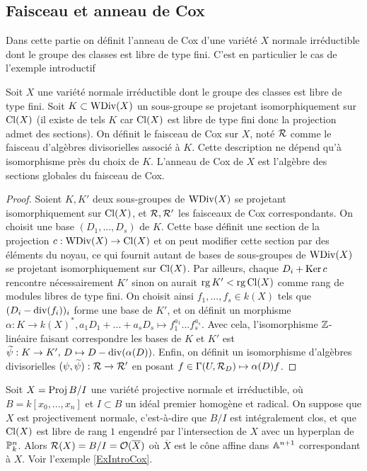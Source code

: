\subsection{Faisceau et anneau de Cox}

Dans cette partie on définit l'anneau de Cox d'une variété $X$ normale irréductible dont le groupe des classes est libre de type fini. C'est en particulier le cas de l'exemple introductif

\begin{cons}\label{consFreeCoxRing}
Soit $X$ une variété normale irréductible dont le groupe des classes est libre de type fini. Soit $K\subset \operatorname{WDiv}(X)$ un sous-groupe se projetant isomorphiquement sur $\operatorname{Cl}(X)$ (il existe de tels $K$ car $\operatorname{Cl}(X)$ est libre de type fini donc la projection admet des sections). On définit le faisceau de Cox sur $X$, noté $\mathcal{R}$ comme le faisceau d'algèbres divisorielles associé à $K$. Cette description ne dépend qu'à isomorphisme près du choix de $K$. L'anneau de Cox de $X$ est l'algèbre des sections globales du faisceau de Cox. 
\end{cons}
\begin{proof}
Soient $K,K'$ deux sous-groupes de $\operatorname{WDiv}(X)$ se projetant isomorphiquement sur $\operatorname{Cl}(X)$, et $\mathcal{R},\mathcal{R}'$ les faisceaux de Cox correspondants. On choisit une base $(D_1,...,D_s)$ de $K$. Cette base définit une section de la projection $c:\operatorname{WDiv}(X)\rightarrow \operatorname{Cl}(X)$ et on peut modifier cette section par des éléments du noyau, ce qui fournit autant de bases de sous-groupes de $\operatorname{WDiv}(X)$ se projetant isomorphiquement sur $\operatorname{Cl}(X)$. Par ailleurs, chaque $D_i+\operatorname{Ker} c$ rencontre nécessairement $K'$ sinon on aurait $\operatorname{rg} K' < \operatorname{rg} \operatorname{Cl}(X)$ comme rang de modules libres de type fini. On choisit ainsi $f_1,...,f_s\in k(X)$ tels que $(D_i-\operatorname{div}(f_i))_i$ forme une base de $K'$, et on définit un morphisme $\alpha:K\rightarrow k(X)^*, a_1D_1+...+a_sD_s\mapsto f_1^{a_1}...f_s^{a_s}$. Avec cela, l'isomorphisme $\mathbb{Z}$-linéaire faisant correspondre les bases de $K$ et $K'$ est $\widetilde{\psi}:K\rightarrow K',\, D\mapsto D-\operatorname{div}(\alpha(D))$. Enfin, on définit un isomorphisme d'algèbres divisorielles $(\psi, \widetilde{\psi}): \mathcal{R}\rightarrow\mathcal{R}'$ en posant $f\in \Gamma(U, \mathcal{R}_D)\mapsto \alpha(D)f$.
\end{proof}

\begin{ex}
Soit $X=\operatorname{Proj} B/I$ une variété projective normale et irréductible, où $B=k[x_0,...,x_n]$ et $I\subset B$ un idéal premier homogène et radical. On suppose que $X$ est projectivement normale, c'est-à-dire que $B/I$ est intégralement clos, et que $\operatorname{Cl}(X)$ est libre de rang $1$ engendré par l'intersection de $X$ avec un hyperplan de $\mathbb{P}^n_k$. Alors $\mathcal{R}(X)=B/I=\mathcal{O}(\overline{X})$ où $\overline{X}$ est le cône affine dans $\mathbb{A}^{n+1}$ correspondant à $X$. Voir l'exemple \ref{ExIntroCox}.
\end{ex}

